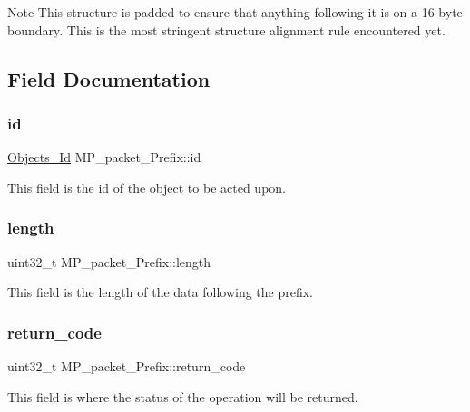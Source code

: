 \begin{DoxyNote}{Note}
This structure is padded to ensure that anything following it is on a 16 byte boundary. This is the most stringent structure alignment rule encountered yet. 
\end{DoxyNote}


\subsection{Field Documentation}
\mbox{\label{structMP__packet__Prefix_aa5ad51ac9ad8ceb21a10d692f0330f74}} 
\subsubsection{\texorpdfstring{id}{id}}
{\footnotesize\ttfamily \mbox{\hyperlink{group__RTEMSScoreObject_ga5821f52a51072941bdd603e542d0863e}{Objects\+\_\+\+Id}} M\+P\+\_\+packet\+\_\+\+Prefix\+::id}

This field is the id of the object to be acted upon. \mbox{\label{structMP__packet__Prefix_aef4dcc3230663748d0982513eb11b15a}} 
\subsubsection{\texorpdfstring{length}{length}}
{\footnotesize\ttfamily uint32\+\_\+t M\+P\+\_\+packet\+\_\+\+Prefix\+::length}

This field is the length of the data following the prefix. \mbox{\label{structMP__packet__Prefix_af56a9f18ae9ecbb27f193150671d4fdc}} 
\subsubsection{\texorpdfstring{return\_code}{return\_code}}
{\footnotesize\ttfamily uint32\+\_\+t M\+P\+\_\+packet\+\_\+\+Prefix\+::return\+\_\+code}

This field is where the status of the operation will be returned. \mbox{\label{structMP__packet__Prefix_a72d7f5806281fcd6b3e0159f43d8150b}} 
